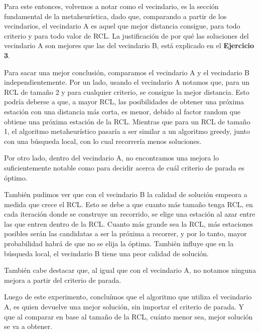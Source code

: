 Para este entonces, volvemos a notar como el vecindario, es la sección fundamental de la metaheurística, dado que, comparando a partir de los vecindarios, el vecindario A es aquel que mejor distancia consigue, para todo criterio y para todo valor de RCL. La justificación de por qué las soluciones del vecindario A son mejores que las del vecindario B, está explicado en el \textbf{Ejercicio 3}. 
\par Para sacar una mejor conclusión, comparamos el vecindario A y el vecindario B independientemente. 
Por un lado, usando el vecindario A notamos que, para un RCL de tamaño 2 y para cualquier criterio, se consigue la mejor distancia. Esto podría deberse a que, a mayor RCL, las posibilidades de obtener una próxima estación con una distancia más corta, es menor, debido al factor random que obtiene una próxima estación de la RCL. Mientras que para un RCL de tamaño 1, el algoritmo metaheurístico pasaría a ser similar a un algoritmo greedy, junto con una búsqueda local, con lo cual recorrería menos soluciones. 
\par Por otro lado, dentro del vecindario A, no encontramos una mejora lo suficientemente notable como para decidir acerca de cuál criterio de parada es óptimo. 
\par También pudimos ver que con el vecindario B la calidad de solución empeora a medida que crece el RCL. Esto se debe a que cuanto más tamaño tenga RCL, en cada iteración donde se construye un recorrido, se elige una estación al azar entre las que entren dentro de la RCL. Cuanto más grande sea la RCL, más estaciones posibles serán las candidatas a ser la próxima a recorrer, y por lo tanto, mayor probabilidad habrá de que no se elija la óptima. 
También influye que en la búsqueda local, el vecindario B tiene una peor calidad de solución. 
\par También cabe destacar que, al igual que con el vecindario A, no notamos ninguna mejora a partir del criterio de parada. 
\par Luego de este experimento, concluímos que el algoritmo que utiliza el vecindario A, es quien devuelve una mejor solución, sin importar el criterio de parada. Y que al comparar en base al tamaño de la RCL, cuánto menor sea, mejor solución se va a obtener.


